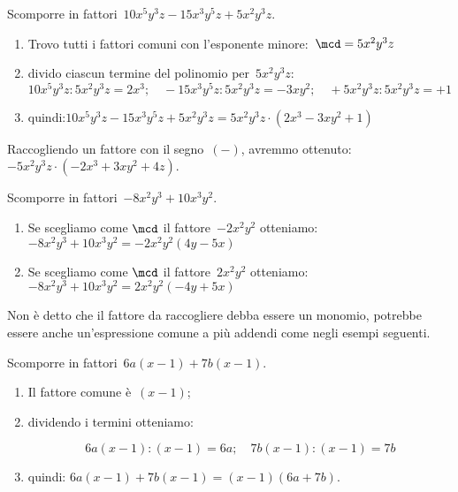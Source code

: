 \begin{esempio}{}{}
Scomporre in fattori~\(10x^{5}y^{3}z-15x^3y^{5}z+5x^2y^{3}z\).
\begin{enumerate} [left=0mm, noitemsep]
\item Trovo tutti i fattori comuni con l'esponente 
minore:~\(\mcd=5x^2y^{3}z\)
\item divido ciascun termine del polinomio per~\(5x^2y^{3}z\):\\[.2em]
\hspace*{-8mm} {\small 
\(10x^{5}y^{3}z:5x^2y^{3}z=2x^3; \quad
-15x^3y^{5}z:5x^2y^{3}z=-3xy^{2}; \quad
+5x^2y^{3}z:5x^2y^{3}z=+1\)
}\\[-.7em]
\item quindi:\quad \(10x^{5}y^{3}z-15x^3y^{5}z+5x^2y^{3}z =
5x^2y^{3}z \cdot (2x^3-3xy^{2}+1)\)
\end{enumerate}
\end{esempio}


\begin{osservazione}{}{} 
Raccogliendo un fattore con il segno~\((-)\), avremmo 
ottenuto:~\(-5x^2y^{3}z \cdot (-2x^3+3xy^{2}+4z)\).
\end{osservazione}

\begin{esempio}{}{}
Scomporre in fattori~\(-8x^2y^{3}+10x^3y^{2}\).
\begin{enumerate} [left=0mm, noitemsep]
\item  Se scegliamo come \(\mcd\) il fattore~\(-2x^2y^{2}\)
otteniamo: \\
\(-8x^2y^{3}+10x^3y^{2}=-2x^2y^{2}(4y-5x)\)
\item Se scegliamo come \(\mcd\) il fattore~\(2x^2y^{2}\)
otteniamo: \\
\(-8x^2y^{3}+10x^3y^{2}=2x^2y^{2}(-4y+5x)\)
\end{enumerate}
\end{esempio}

Non è detto che il fattore da raccogliere debba essere un monomio, 
potrebbe essere anche un'espressione comune a più addendi come 
negli esempi seguenti.

\begin{esempio}{}{}
Scomporre in fattori~\(6a(x-1)+7b(x-1)\).
\begin{enumerate} [left=0mm, noitemsep]
\item Il fattore comune è~\((x-1)\); 
\item dividendo i termini otteniamo:

\vspace{-1.2em}
\[6a(x-1):(x-1)=6a; \quad 7b(x-1):(x-1)=7b\]
\vspace{-1.6em}
\item quindi: \quad \(6a(x-1)+7b(x-1)=(x-1)(6a+7b)\).
\end{enumerate}
\end{esempio}

